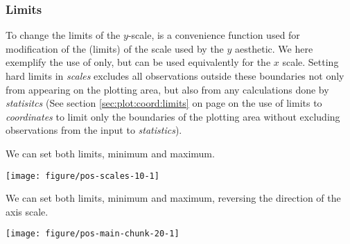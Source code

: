 \documentclass[krantz2]{krantz}\usepackage{knitr}%
\begin{document}
\subsubsection{Limits}

To change the limits of the $y$-scale,  is a convenience function used for modification of the  (limits) of the scale used by the $y$ aesthetic. We here exemplify the use of  only, but  can be used equivalently for the $x$ scale. Setting hard limits in \emph{scales} excludes all observations outside these boundaries not only from appearing on the plotting area, but also from any calculations done by \emph{statisitcs} (See section \ref{sec:plot:coord:limits} on page \pageref{sec:plot:coord:limits} on the use of limits to \emph{coordinates} to limit only the boundaries of the plotting area without excluding observations from the input to \emph{statistics}).

We can set both limits, minimum and maximum.

\begin{knitrout}\footnotesize
{}\color{fgcolor}\begin{kframe}
\begin{alltt}
  \hlopt{+} \hlstd{()} \hlopt{+} \hlstd{(}\hlstd{,} \hlstd{)}
\end{alltt}
\end{kframe}

{\centering \texttt{[image: figure/pos-scales-10-1]} 

}



\end{knitrout}

We can set both limits, minimum and maximum, reversing the direction of the axis scale.

\begin{knitrout}\footnotesize
{}\color{fgcolor}\begin{kframe}
\begin{alltt}
  \hlopt{+} \hlstd{()} \hlopt{+} \hlstd{(}\hlstd{,} \hlstd{)}
\end{alltt}
\end{kframe}

{\centering \texttt{[image: figure/pos-main-chunk-20-1]} 

}



\end{knitrout}
\end{document}
